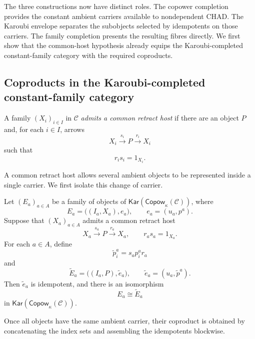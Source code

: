\documentclass[runningheads,envcountsame]{llncs}
\newcommand{\Copow}{\mathsf{Copow}}
\newcommand{\Kar}{\mathsf{Kar}}
\begin{document}
The three constructions now have distinct roles. The copower completion provides the constant ambient carriers available to nondependent CHAD\@. The Karoubi envelope separates the subobjects selected by idempotents on those carriers. The family completion presents the resulting fibres directly. We first show that the common-host hypothesis already equips the Karoubi-completed constant-family category with the required coproducts.




















\subsection{Coproducts in the Karoubi-completed constant-family category}

\begin{definition}
	\label{def:host}
	A family $(X_i)_{i\in I}$ in $\mathcal C$ \emph{admits a common retract host}
	if there are an object $P$ and, for each $i\in I$, arrows
	$$
	X_i\xrightarrow{s_i}P\xrightarrow{r_i}X_i
	$$
	such that
	$$
	r_is_i=1_{X_i}.
	$$
\end{definition}

A common retract host allows several ambient objects to be represented inside
a single carrier. We first isolate this change of carrier.

\begin{lemma}
	\label{lem:common-carrier}
	Let $(E_a)_{a\in A}$ be a family of objects of
	$\Kar(\Copow_\kappa(\mathcal C))$, where
	$$
	E_a=\bigl((I_a,X_a),e_a\bigr),
	\qquad
	e_a=(u_a,p^a).
	$$
	Suppose that $(X_a)_{a\in A}$ admits a common retract host
	$$
	X_a\xrightarrow{s_a}P\xrightarrow{r_a}X_a,
	\qquad
	r_as_a=1_{X_a}.
	$$
	For each $a\in A$, define
	$$
	\widetilde p^a_i=s_ap^a_ir_a
	$$
	and
	$$
	\widetilde E_a
	=
	\bigl((I_a,P),\widetilde e_a\bigr),
	\qquad
	\widetilde e_a=(u_a,\widetilde p^a).
	$$
	Then $\widetilde e_a$ is idempotent, and there is an isomorphism
	$$
	E_a\cong\widetilde E_a
	$$
	in $\Kar(\Copow_\kappa(\mathcal C))$.
\end{lemma}


Once all objects have the same ambient carrier, their coproduct is obtained
by concatenating the index sets and assembling the idempotents blockwise.
\end{document}
